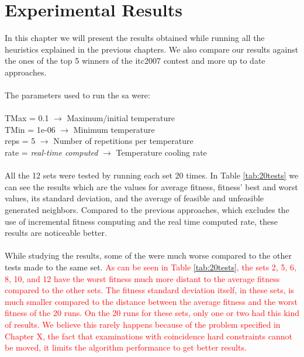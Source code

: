 \chapter{Experimental Results}
\label{chap:ExpResults}

In this chapter we will present the results obtained while running all the heuristics explained in the previous chapters. We also compare our results against the ones of the top 5 winners of the \gls{itc2007} contest and more up to date approaches.\\
\\
The parameters used to run the \gls{sa} were:\\
\\
TMax = 0.1 $\rightarrow$ Maximum/initial temperature\\
TMin = 1e-06 $\rightarrow$ Minimum temperature\\
reps = 5 $\rightarrow$ Number of repetitions per temperature\\
rate = \textit{real-time computed} $\rightarrow$ Temperature cooling rate\\
\\
All the 12 sets were tested by running each set 20 times. In Table \ref{tab:20tests} we can see the results which are the values for average fitness, fitness' best and worst values, its standard deviation, and the average of feasible and unfeasible generated neighbors. Compared to the previous approaches, which excludes the use of incremental fitness computing and the real time computed rate, these results are noticeable better. \\
\\
While studying the results, some of the were much worse compared to the other tests made to the same set. \textcolor{red}{As can be seen in Table \ref{tab:20tests}, the sets 2, 5, 6, 8, 10, and 12 have the worst fitness much more distant to the average fitness compared to the other sets. The fitness standard deviation itself, in these sets, is much smaller compared to the distance between the average fitness and the worst fitness of the 20 runs. On the 20 runs for these sets, only one or two had this kind of results. We believe this rarely happens because of the problem specified in Chapter X, the fact that examinations with coincidence hard constraints cannot be moved, it limits the algorithm performance to get better results.}\\
\\
